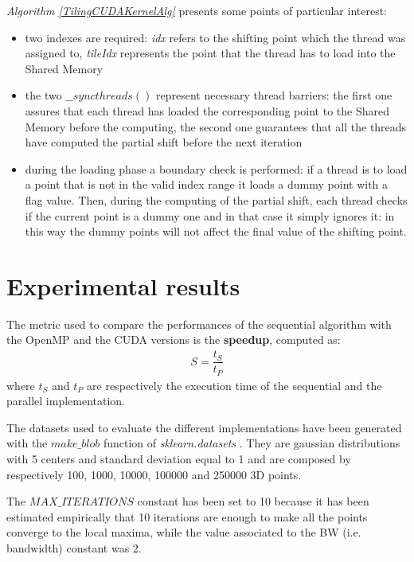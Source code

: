 \documentclass[10pt,twocolumn,letterpaper]{article}
\begin{document}
\emph{Algorithm \ref{TilingCUDAKernelAlg}} presents some points of particular interest:
\begin{itemize}
\item two indexes are required: \emph{idx} refers to the shifting point which the thread was assigned to, \emph{tileIdx} represents the point that the thread has to load into the Shared Memory
\item the two $\_\_syncthreads()$ represent necessary thread barriers: the first one assures that each thread has loaded the corresponding point to the Shared Memory before the computing, the second one guarantees that all the threads have computed the partial shift before the next iteration
\item during the loading phase a boundary check is performed: if a thread is to load a point that is not in the valid index range it loads a dummy point with a flag value. Then, during the computing of the partial shift, each thread checks if the current point is a dummy one and in that case it simply ignores it: in this way the dummy points will not affect the final value of the shifting point.
\end{itemize}


\section{Experimental results}
The metric used to compare the performances of the sequential algorithm with the OpenMP and the CUDA versions is the \textbf{speedup}, computed as:
\begin{align}
S = \dfrac{t_S}{t_P}
\end{align}
where $t_S$ and $t_P$ are respectively the execution time of the sequential and the parallel implementation.

The datasets used to evaluate the different implementations have been generated with the \emph{$make\_blob$} function of \emph{sklearn.datasets} \cite{scikit-learn}. They are gaussian distributions with 5 centers and standard deviation equal to 1 and are composed by respectively 100, 1000, 10000, 100000 and 250000 3D points.

The $MAX\_ITERATIONS$ constant has been set to 10 because it has been estimated empirically that 10 iterations are enough to make all the points converge to the local maxima, while the value associated to the BW (i.e. bandwidth) constant was 2.
\end{document}

